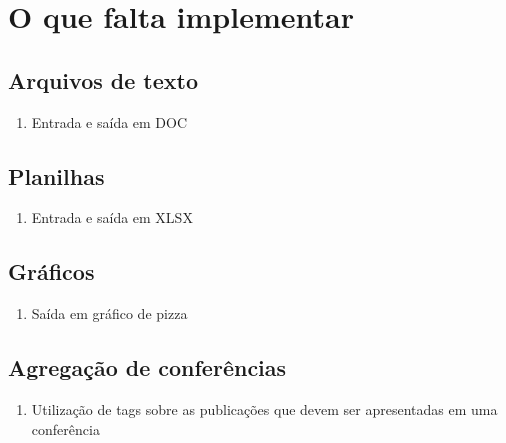 \section{O que falta implementar}
\subsection{Arquivos de texto}
\begin{enumerate}
\item Entrada e saída em DOC
\end{enumerate}

\subsection{Planilhas}
\begin{enumerate}
\item Entrada e saída em XLSX
\end{enumerate}

\subsection{Gráficos}
\begin{enumerate}
\item Saída em gráfico de pizza
\end{enumerate}

\subsection{Agregação de conferências}
\begin{enumerate}
\item Utilização de tags sobre as publicações que devem ser apresentadas em uma conferência
\end{enumerate}